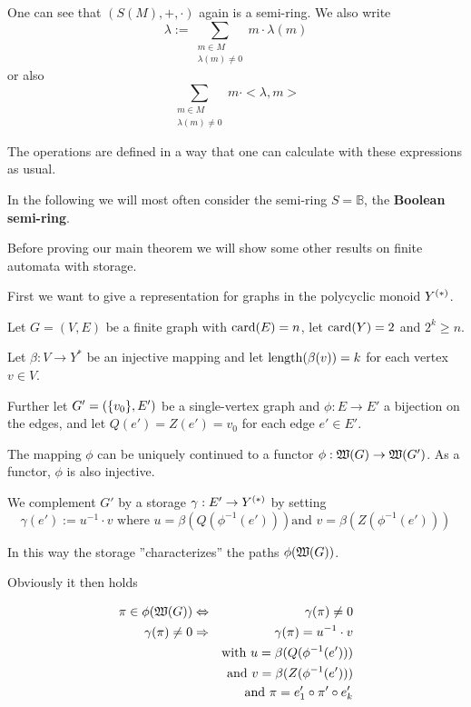 One can see that $(S(M), +, \cdot)$ again is a semi-ring. We also write
\[ \lambda := \sum_{\substack{m \in M\\\lambda(m)\neq 0}} m \cdot \lambda(m) \]
or also
\[ \sum_{\substack{m \in M\\\lambda(m)\neq 0}} m \cdot {<}\lambda, m{>} \]

The operations are defined in a way that one can calculate with these
expressions as usual.

In the following we will most often consider the semi-ring $S = \mathbb{B}$, the
{\bf Boolean semi-ring}.

\bigskip
Before proving our main theorem we will show some other results on finite
automata with storage.

\bigskip
First we want to give a representation for graphs in the polycyclic monoid
$\mbox{${Y}^{(*)}$}$.

Let $G=(V, E)$ be a finite graph with $\mathrm{card}({E}) = n$, let $\mathrm{card}({Y}) = 2$ and
$2^k \geq n$.

Let $\beta: V \to Y^*$ be an injective mapping and let $\mathrm{length}({\beta(v)}) = k$
for each vertex $v \in V$.

Further let $G' = (\mbox{$\{v_0\}$}, E')$ be a single-vertex graph and $\phi: E \to
E'$ a bijection on the edges, and let $Q(e') = Z(e') = v_0$ for each edge $e'
\in E'$.

The mapping $\phi$ can be uniquely continued to a functor $\phi : \mbox{$\mathfrak{W}({G})$}
\to \mbox{$\mathfrak{W}({G'})$}$. As a functor, $\phi$ is also injective.

We complement $G'$ by a storage $\gamma: E' \to \mbox{${Y}^{(*)}$}$ by setting
\[ \gamma(e') := u^{-1} \cdot v\text{ where }u = \beta(Q(\phi^{-1}(e')))\text{
and }v = \beta(Z(\phi^{-1}(e'))) \]

In this way the storage ''characterizes'' the paths $\phi(\mbox{$\mathfrak{W}({G})$})$.

Obviously it then holds
\begin{lemma}
\begin{eqnarray*}
\pi \in \phi(\mbox{$\mathfrak{W}({G})$}) &\Leftrightarrow& \gamma(\pi) \neq 0 \\
\gamma(\pi) \neq 0 &\Rightarrow& \gamma(\pi) = u^{-1} \cdot v \\
&& \text{with }u = \beta(Q(\phi^{-1}(e'))) \\
&& \text{and }v = \beta(Z(\phi^{-1}(e'))) \\
&& \text{and }\pi = e'_1 \circ \pi' \circ e'_k
\end{eqnarray*}
\end{lemma}

